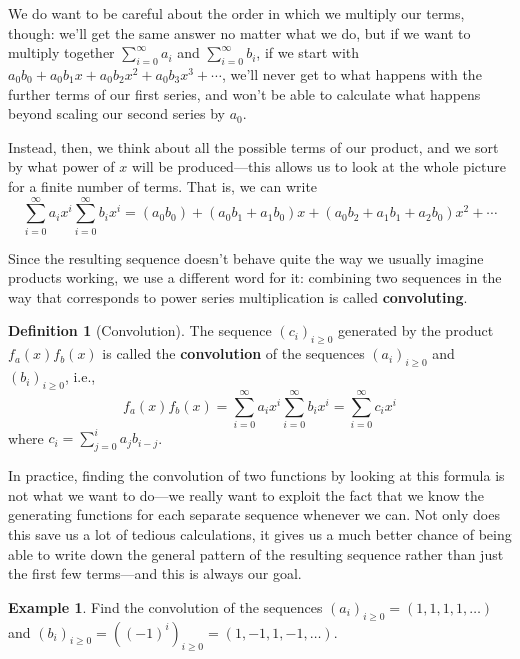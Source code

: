 \documentclass{article}
\theoremstyle{definition}
\newtheorem{definition}{Definition}
\newtheorem{example}{Example}
\begin{document}
We do want to be careful about the order in which we multiply our terms, though: we'll get the same answer no matter what we do, but if we want to multiply together $\sum_{i=0}^{\infty} a_{i}$ and $\sum_{i=0}^{\infty} b_{i}$, if we start with $a_{0} b_{0}+a_{0} b_{1} x+a_{0} b_{2} x^{2}+a_{0} b_{3} x^{3}+\cdots$, we'll never get to what happens with the further terms of our first series, and won't be able to calculate what happens beyond scaling our second series by $a_{0}$.

Instead, then, we think about all the possible terms of our product, and we sort by what power of $x$ will be produced---this allows us to look at the whole picture for a finite number of terms. That is, we can write
\[\sum_{i=0}^{\infty} a_{i} x^{i} \sum_{i=0}^{\infty} b_{i} x^{i}=\left(a_{0} b_{0}\right)+\left(a_{0} b_{1}+a_{1} b_{0}\right) x+\left(a_{0} b_{2}+a_{1} b_{1}+a_{2} b_{0}\right) x^{2}+\cdots\]

Since the resulting sequence doesn't behave quite the way we usually imagine products working, we use a different word for it: combining two sequences in the way that corresponds to power series multiplication is called \textbf{convoluting}.

\begin{definition}[Convolution]
The sequence $\left(c_{i}\right)_{i \geq 0}$ generated by the product $f_{a}(x) f_{b}(x)$ is called the \textbf{convolution} of the sequences $\left(a_{i}\right)_{i \geq 0}$ and $\left(b_{i}\right)_{i \geq 0}$, i.e.,
\[f_{a}(x) f_{b}(x)=\sum_{i=0}^{\infty} a_{i} x^{i} \sum_{i=0}^{\infty} b_{i} x^{i}=\sum_{i=0}^{\infty} c_{i} x^{i}\]
where $c_{i}=\sum_{j=0}^{i} a_{j} b_{i-j}$.
\end{definition}

In practice, finding the convolution of two functions by looking at this formula is not what we want to do---we really want to exploit the fact that we know the generating functions for each separate sequence whenever we can. Not only does this save us a lot of tedious calculations, it gives us a much better chance of being able to write down the general pattern of the resulting sequence rather than just the first few terms---and this is always our goal.

\begin{example}
Find the convolution of the sequences $\left(a_{i}\right)_{i \geq 0}=(1,1,1,1, \ldots)$ and $\left(b_{i}\right)_{i \geq 0}=\left((-1)^{i}\right)_{i \geq 0}=(1,-1,1,-1, \ldots)$.
\end{example}
\end{document}
